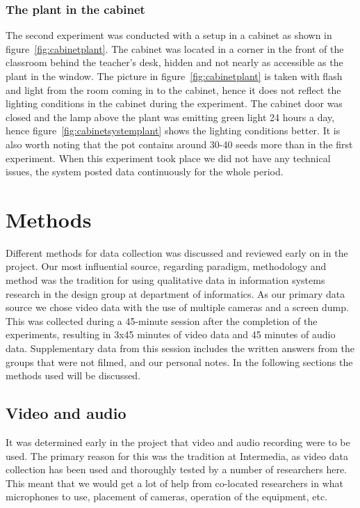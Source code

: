 \subsubsection*{The plant in the cabinet}
The second experiment was conducted with a setup in a cabinet as shown in figure~\ref{fig:cabinetplant}. The cabinet was located in a corner in the front of the classroom behind the teacher's desk, hidden and not nearly as accessible as the plant in the window. The picture in figure~\ref{fig:cabinetplant} is taken with flash and light from the room coming in to the cabinet, hence it does not reflect the lighting conditions in the cabinet during the experiment. The cabinet door was closed and the lamp above the plant was emitting green light 24 hours a day, hence figure~\ref{fig:cabinetsystemplant} shows the lighting conditions better. It is also worth noting that the pot contains around 30-40 seeds more than in the first experiment. When this experiment took place we did not have any technical issues, the system posted data continuously for the whole period.


\section{Methods}
Different methods for data collection was discussed and reviewed early on in the project. Our most influential source, regarding paradigm, methodology and method was the tradition for using qualitative data in information systems research in the design group at department of informatics. As our primary data source we chose video data with the use of multiple cameras and a screen dump. This was collected during a 45-minute session after the completion of the experiments, resulting in 3x45 minutes of video data and 45 minutes of audio data. Supplementary data from this session includes the written answers from the groups that were not filmed, and our personal notes. In the following sections the methods used will be discussed. 

\subsection{Video and audio}
It was determined early in the project that video and audio recording were to be used. The primary reason for this was the tradition at Intermedia, as video data collection has been used and thoroughly tested by a number of researchers here. This meant that we would get a lot of help from co-located researchers in what microphones to use, placement of cameras, operation of the equipment, etc. 

